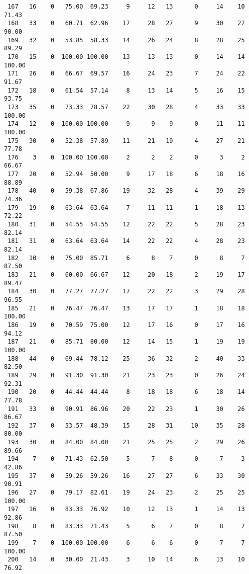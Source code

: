 \begin{verbatim}
 167   16    0   75.00  69.23     9     12   13      0     14    10    71.43
 168   33    0   60.71  62.96    17     28   27      9     30    27    90.00
 169   32    0   53.85  58.33    14     26   24      8     28    25    89.29
 170   15    0  100.00 100.00    13     13   13      0     14    14   100.00
 171   26    0   66.67  69.57    16     24   23      7     24    22    91.67
 172   18    0   61.54  57.14     8     13   14      5     16    15    93.75
 173   35    0   73.33  78.57    22     30   28      4     33    33   100.00
 174   12    0  100.00 100.00     9      9    9      0     11    11   100.00
 175   30    0   52.38  57.89    11     21   19      4     27    21    77.78
 176    3    0  100.00 100.00     2      2    2      0      3     2    66.67
 177   20    0   52.94  50.00     9     17   18      6     18    16    88.89
 178   40    0   59.38  67.86    19     32   28      4     39    29    74.36
 179   19    0   63.64  63.64     7     11   11      1     18    13    72.22
 180   31    0   54.55  54.55    12     22   22      5     28    23    82.14
 181   31    0   63.64  63.64    14     22   22      4     28    23    82.14
 182   10    0   75.00  85.71     6      8    7      0      8     7    87.50
 183   21    0   60.00  66.67    12     20   18      2     19    17    89.47
 184   30    0   77.27  77.27    17     22   22      3     29    28    96.55
 185   21    0   76.47  76.47    13     17   17      1     18    18   100.00
 186   19    0   70.59  75.00    12     17   16      0     17    16    94.12
 187   21    0   85.71  80.00    12     14   15      1     19    19   100.00
 188   44    0   69.44  78.12    25     36   32      2     40    33    82.50
 189   29    0   91.30  91.30    21     23   23      0     26    24    92.31
 190   20    0   44.44  44.44     8     18   18      6     18    14    77.78
 191   33    0   90.91  86.96    20     22   23      1     30    26    86.67
 192   37    0   53.57  48.39    15     28   31     10     35    28    80.00
 193   30    0   84.00  84.00    21     25   25      2     29    26    89.66
 194    7    0   71.43  62.50     5      7    8      0      7     3    42.86
 195   37    0   59.26  59.26    16     27   27      6     33    30    90.91
 196   27    0   79.17  82.61    19     24   23      2     25    25   100.00
 197   16    0   83.33  76.92    10     12   13      1     14    13    92.86
 198    8    0   83.33  71.43     5      6    7      0      8     7    87.50
 199    7    0  100.00 100.00     6      6    6      0      7     7   100.00
 200   14    0   30.00  21.43     3     10   14      6     13    10    76.92

\end{verbatim}
